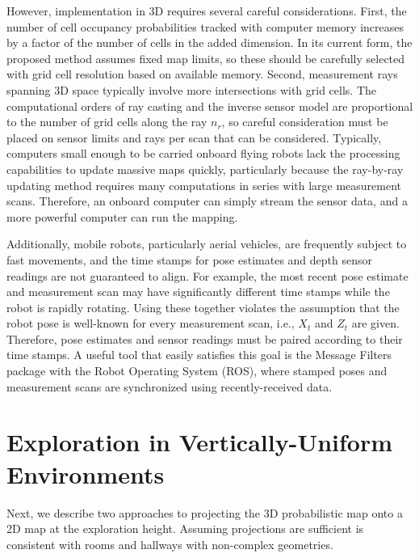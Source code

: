 However, implementation in 3D requires several careful considerations. First, the number of cell occupancy probabilities tracked with computer memory increases by a factor of the number of cells in the added dimension. In its current form, the proposed method assumes fixed map limits, so these should be carefully selected with grid cell resolution based on available memory. Second, measurement rays spanning 3D space typically involve more intersections with grid cells. The computational orders of ray casting and the inverse sensor model are proportional to the number of grid cells along the ray $n_r$, so careful consideration must be placed on sensor limits and rays per scan that can be considered. Typically, computers small enough to be carried onboard flying robots lack the processing capabilities to update massive maps quickly, particularly because the ray-by-ray updating method requires many computations in series with large measurement scans. Therefore, an onboard computer can simply stream the sensor data, and a more powerful computer can run the mapping.

Additionally, mobile robots, particularly aerial vehicles, are frequently subject to fast movements, and the time stamps for pose estimates and depth sensor readings are not guaranteed to align. For example, the most recent pose estimate and measurement scan may have significantly different time stamps while the robot is rapidly rotating. Using these together violates the assumption that the robot pose is well-known for every measurement scan, i.e., $X_t$ and $Z_t$ are given. Therefore, pose estimates and sensor readings must be paired according to their time stamps. A useful tool that easily satisfies this goal is the Message Filters package with the Robot Operating System (ROS), where stamped poses and measurement scans are synchronized using recently-received data.

\section{Exploration in Vertically-Uniform Environments}
\label{sec:MapProjections}

Next, we describe two approaches to projecting the 3D probabilistic map onto a 2D map at the exploration height. Assuming projections are sufficient is consistent with rooms and hallways with non-complex geometries.

